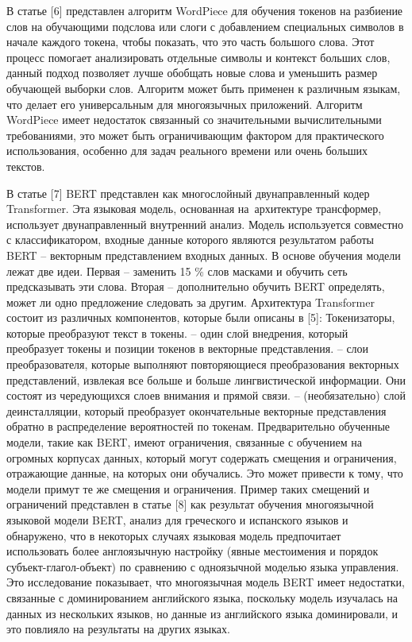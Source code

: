 В статье {[}6{]} представлен алгоритм WordPiece для обучения токенов на
разбиение слов на обучающими подслова или слоги с добавлением
специальных символов в начале каждого токена, чтобы показать, что это
часть большого слова. Этот процесс помогает анализировать отдельные
символы и контекст больших слов, данный подход позволяет лучше обобщать
новые слова и уменьшить размер обучающей выборки слов. Алгоритм может
быть применен к различным языкам, что делает его универсальным для
многоязычных приложений. Алгоритм WordPiece имеет недостаток связанный
со значительными вычислительными требованиями, это может быть
ограничивающим фактором для практического использования, особенно для
задач реального времени или очень больших текстов.

В статье {[}7{]} BERT представлен как многослойный двунаправленный кодер
Transformer. Эта языковая модель, основанная на~архитектуре трансформер,
использует двунаправленный внутренний анализ. Модель используется
совместно с классификатором, входные данные которого являются
результатом работы BERT -- векторным представлением входных данных. В
основе обучения модели лежат две идеи. Первая -- заменить 15 \% слов
масками и обучить сеть предсказывать эти слова. Вторая -- дополнительно
обучить BERT определять, может ли одно предложение следовать за другим.
Архитектура Transformer состоит из различных компонентов, которые были
описаны в {[}5{]}: Токенизаторы, которые преобразуют текст в токены. --
один слой внедрения, который преобразует токены и позиции токенов в
векторные представления. -- слои преобразователя, которые выполняют
повторяющиеся преобразования векторных представлений, извлекая все
больше и больше лингвистической информации. Они состоят из чередующихся
слоев внимания и прямой связи. -- (необязательно) слой деинсталляции,
который преобразует окончательные векторные представления обратно в
распределение вероятностей по токенам. Предварительно обученные модели,
такие как BERT, имеют ограничения, связанные с обучением на огромных
корпусах данных, который могут содержать смещения и ограничения,
отражающие данные, на которых они обучались. Это может привести к тому,
что модели примут те же смещения и ограничения. Пример таких смещений и
ограничений представлен в статье {[}8{]} как результат обучения
многоязычной языковой модели BERT, анализ для греческого и испанского
языков и обнаружено, что в некоторых случаях языковая модель
предпочитает использовать более англоязычную настройку (явные
местоимения и порядок субъект-глагол-объект) по сравнению с одноязычной
моделью языка управления. Это исследование показывает, что многоязычная
модель BERT имеет недостатки, связанные с доминированием английского
языка, поскольку модель изучалась на данных из нескольких языков, но
данные из английского языка доминировали, и это повлияло на результаты
на других языках.

